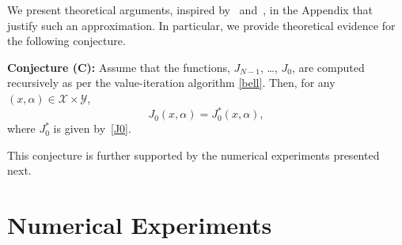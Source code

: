 \documentclass[letterpaper, 10 pt, conference]{ieeeconf}  %
\newtheorem{remark}{Remark}
\begin{document}
We present theoretical arguments, inspired by~\cite{chow2015risk} and~\cite[Sec. 1.5]{bertsekas2005dynamic}, 
in the Appendix that justify such an approximation. In particular, we provide theoretical evidence for the following conjecture.  

{\bf Conjecture (C):}
Assume that the functions, $J_{N-1}$, \dots, $J_0$, are computed recursively as per the value-iteration algorithm \eqref{bell}. 
Then, for any $(x, \alpha) \in \mathcal{X} \times \mathcal{Y}$,
\begin{equation}
\label{thm:eq}
J_0(x,\alpha) = J_0^*(x, \alpha),
\end{equation}
where $J_0^*$ is given by~\eqref{J0}.

This conjecture is further supported by the numerical experiments presented next.

%
\section{Numerical Experiments}\label{sec::ex}
\end{document}
